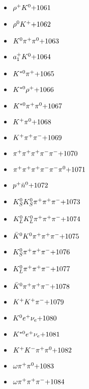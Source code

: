 \begin{multicols}{3}
\begin{itemize}
 \item $ \rho^{+} K^{0} \hfill{+1061}$
 \item $ \rho^{0} K^{+} \hfill{+1062}$
 \item $ K^{0} \pi^{+} \pi^{0} \hfill{+1063}$
 \item $ a_{1}^{+} K^{0} \hfill{+1064}$
 \item $ K^{*0} \pi^{+} \hfill{+1065}$
 \item $ K^{*0} \rho^{+} \hfill{+1066}$
 \item $ K^{*0} \pi^{+} \pi^{0} \hfill{+1067}$
 \item $ K^{+} \pi^{0} \hfill{+1068}$
 \item $ K^{+} \pi^{+} \pi^{-} \hfill{+1069}$
 \item $ \pi^{+} \pi^{+} \pi^{+} \pi^{-} \pi^{-} \hfill{+1070}$
 \item $ \pi^{+} \pi^{+} \pi^{+} \pi^{-} \pi^{-} \pi^{0} \hfill{+1071}$
 \item $ p^{+} \bar{n}^{0} \hfill{+1072}$
 \item $ K_{S}^{0} K_{S}^{0} \pi^{+} \pi^{+} \pi^{-} \hfill{+1073}$
 \item $ K_{L}^{0} K_{L}^{0} \pi^{+} \pi^{+} \pi^{-} \hfill{+1074}$
 \item $ \bar{K}^{0} K^{0} \pi^{+} \pi^{+} \pi^{-} \hfill{+1075}$
 \item $ K_{S}^{0} \pi^{+} \pi^{+} \pi^{-} \hfill{+1076}$
 \item $ K_{L}^{0} \pi^{+} \pi^{+} \pi^{-} \hfill{+1077}$
 \item $ \bar{K}^{0} \pi^{+} \pi^{+} \pi^{-} \hfill{+1078}$
 \item $ K^{+} K^{+} \pi^{-} \hfill{+1079}$
 \item $ K^{0} e^{+} \nu_{e} \hfill{+1080}$
 \item $ K^{*0} e^{+} \nu_{e} \hfill{+1081}$
 \item $ K^{+} K^{-} \pi^{+} \pi^{0} \hfill{+1082}$
 \item $ \omega \pi^{+} \pi^{0} \hfill{+1083}$
 \item $ \omega \pi^{+} \pi^{+} \pi^{-} \hfill{+1084}$
 \end{itemize} 
 \end{multicols} 
